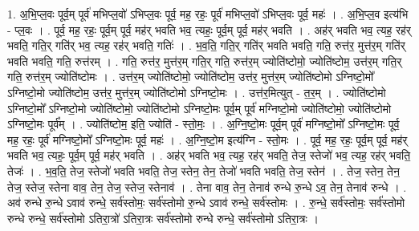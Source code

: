 \documentclass[17pt]{extarticle}
\begin{document}
1. अ॒भि॒प्ल॒वः पूर्व॒म् पूर्व॑ मभिप्ल॒वो॑ ऽभिप्ल॒वः पूर्व॒ मह॒ रहः॒ पूर्व॑ मभिप्ल॒वो॑ ऽभिप्ल॒वः पूर्व॒ महः॑ । . अ॒भि॒प्ल॒व इत्य॑भि - प्ल॒वः । . पूर्व॒ मह॒ रहः॒ पूर्व॒म् पूर्व॒ मह॑र् भवति भव॒ त्यहः॒ पूर्व॒म् पूर्व॒ मह॑र् भवति । . अह॑र् भवति भव॒ त्यह॒ रह॑र् भवति॒ गति॒र् गति॑र् भव॒ त्यह॒ रह॑र् भवति॒ गतिः॑ । . भ॒व॒ति॒ गति॒र् गति॑र् भवति भवति॒ गति॒ रुत्त॑र॒ मुत्त॑र॒म् गति॑र् भवति भवति॒ गति॒ रुत्त॑रम् । . गति॒ रुत्त॑र॒ मुत्त॑र॒म् गति॒र् गति॒ रुत्त॑र॒म् ज्योति॑ष्टोमो॒ ज्योति॑ष्टोम॒ उत्त॑र॒म् गति॒र् गति॒ रुत्त॑र॒म् ज्योति॑ष्टोमः । . उत्त॑र॒म् ज्योति॑ष्टोमो॒ ज्योति॑ष्टोम॒ उत्त॑र॒ मुत्त॑र॒म् ज्योति॑ष्टोमो ऽग्निष्टो॒मो᳚ ऽग्निष्टो॒मो ज्योति॑ष्टोम॒ उत्त॑र॒ मुत्त॑र॒म् ज्योति॑ष्टोमो ऽग्निष्टो॒मः । . उत्त॑र॒मित्युत् - त॒र॒म् । . ज्योति॑ष्टोमो ऽग्निष्टो॒मो᳚ ऽग्निष्टो॒मो ज्योति॑ष्टोमो॒ ज्योति॑ष्टोमो ऽग्निष्टो॒मः पूर्व॒म् पूर्व॑ मग्निष्टो॒मो ज्योति॑ष्टोमो॒ ज्योति॑ष्टोमो ऽग्निष्टो॒मः पूर्व᳚म् । . ज्योति॑ष्टोम॒ इति॒ ज्योति॑ - स्तो॒मः॒ । . अ॒ग्नि॒ष्टो॒मः पूर्व॒म् पूर्व॑ मग्निष्टो॒मो᳚ ऽग्निष्टो॒मः पूर्व॒ मह॒ रहः॒ पूर्व॑ मग्निष्टो॒मो᳚ ऽग्निष्टो॒मः पूर्व॒ महः॑ । . अ॒ग्नि॒ष्टो॒म इत्य॑ग्नि - स्तो॒मः । . पूर्व॒ मह॒ रहः॒ पूर्व॒म् पूर्व॒ मह॑र् भवति भव॒ त्यहः॒ पूर्व॒म् पूर्व॒ मह॑र् भवति । . अह॑र् भवति भव॒ त्यह॒ रह॑र् भवति॒ तेज॒ स्तेजो॑ भव॒ त्यह॒ रह॑र् भवति॒ तेजः॑ । . भ॒व॒ति॒ तेज॒ स्तेजो॑ भवति भवति॒ तेज॒ स्तेन॒ तेन॒ तेजो॑ भवति भवति॒ तेज॒ स्तेन॑ । . तेज॒ स्तेन॒ तेन॒ तेज॒ स्तेज॒ स्तेना वाव॒ तेन॒ तेज॒ स्तेज॒ स्तेनाव॑ । . तेना वाव॒ तेन॒ तेनाव॑ रुन्धे रु॒न्धे ऽव॒ तेन॒ तेनाव॑ रुन्धे । . अव॑ रुन्धे रु॒न्धे ऽवाव॑ रुन्धे॒ सर्व॑स्तोमः॒ सर्व॑स्तोमो रु॒न्धे ऽवाव॑ रुन्धे॒ सर्व॑स्तोमः । . रु॒न्धे॒ सर्व॑स्तोमः॒ सर्व॑स्तोमो रुन्धे रुन्धे॒ सर्व॑स्तोमो ऽतिरा॒त्रो॑ ऽतिरा॒त्रः सर्व॑स्तोमो रुन्धे रुन्धे॒ सर्व॑स्तोमो ऽतिरा॒त्रः । \newline
\end{document}
